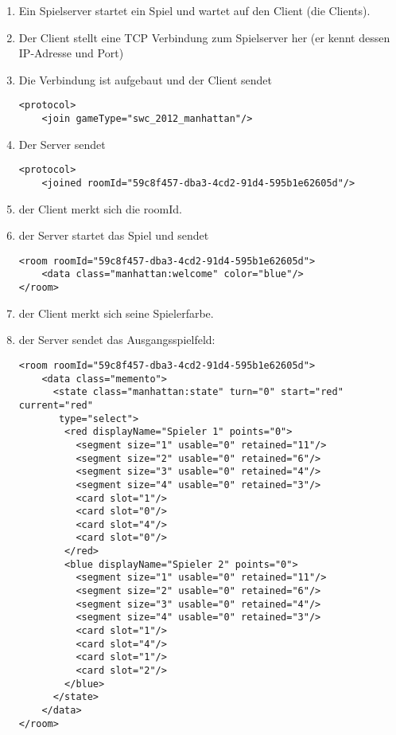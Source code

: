 \documentclass[12pt,a4paper, german, oneside]{scrartcl}
\begin{document}
\begin{enumerate}
\item Ein Spielserver startet ein Spiel und wartet auf den Client (die Clients).
\item Der Client stellt eine TCP Verbindung zum Spielserver her (er kennt dessen IP-Adresse und Port)
\item Die Verbindung ist aufgebaut und der Client sendet \begin{verbatim}
<protocol>
    <join gameType="swc_2012_manhattan"/>
\end{verbatim}
\item Der Server sendet \begin{verbatim}
<protocol>
    <joined roomId="59c8f457-dba3-4cd2-91d4-595b1e62605d"/>
\end{verbatim}
\item der Client merkt sich die roomId.
\item der Server startet das Spiel und sendet \begin{verbatim}
<room roomId="59c8f457-dba3-4cd2-91d4-595b1e62605d">
    <data class="manhattan:welcome" color="blue"/>
</room>
\end{verbatim}
\item der Client merkt sich seine Spielerfarbe.
\item der Server sendet das Ausgangsspielfeld: \begin{verbatim}
<room roomId="59c8f457-dba3-4cd2-91d4-595b1e62605d">
    <data class="memento">
      <state class="manhattan:state" turn="0" start="red" current="red"
       type="select">
        <red displayName="Spieler 1" points="0">
          <segment size="1" usable="0" retained="11"/>
          <segment size="2" usable="0" retained="6"/>
          <segment size="3" usable="0" retained="4"/>
          <segment size="4" usable="0" retained="3"/>
          <card slot="1"/>
          <card slot="0"/>
          <card slot="4"/>
          <card slot="0"/>
        </red>
        <blue displayName="Spieler 2" points="0">
          <segment size="1" usable="0" retained="11"/>
          <segment size="2" usable="0" retained="6"/>
          <segment size="3" usable="0" retained="4"/>
          <segment size="4" usable="0" retained="3"/>
          <card slot="1"/>
          <card slot="4"/>
          <card slot="1"/>
          <card slot="2"/>
        </blue>
      </state>
    </data>
</room>


\end{verbatim}
\end{enumerate}
\end{document}
